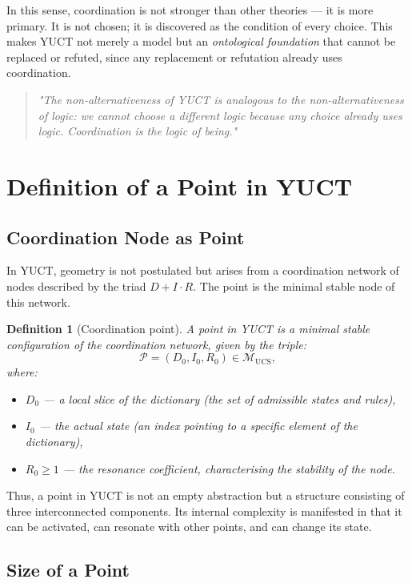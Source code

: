 \documentclass[12pt,a4paper]{article}
\newtheorem{definition}{Definition}
\newcommand{\calP}{\mathcal{P}}
\begin{document}
	In this sense, coordination is not stronger than other theories — it is more primary. It is not chosen; it is discovered as the condition of every choice. This makes YUCT not merely a model but an \emph{ontological foundation} that cannot be replaced or refuted, since any replacement or refutation already uses coordination.
	
	\begin{quote}
		\itshape
		"The non‑alternativeness of YUCT is analogous to the non‑alternativeness of logic: we cannot choose a different logic because any choice already uses logic. Coordination is the logic of being."
	\end{quote}
	
	\section{Definition of a Point in YUCT}
	
	\subsection{Coordination Node as Point}
	
	In YUCT, geometry is not postulated but arises from a coordination network of nodes described by the triad \(D+I\cdot R\). The point is the minimal stable node of this network.
	
	\begin{definition}[Coordination point]
		A point in YUCT is a minimal stable configuration of the coordination network, given by the triple:
		\[
		\calP = (D_0, I_0, R_0) \in \mathcal{M}_{\mathrm{UCS}},
		\]
		where:
		\begin{itemize}
			\item \(D_0\) — a local slice of the dictionary (the set of admissible states and rules),
			\item \(I_0\) — the actual state (an index pointing to a specific element of the dictionary),
			\item \(R_0 \ge 1\) — the resonance coefficient, characterising the stability of the node.
		\end{itemize}
	\end{definition}
	
	Thus, a point in YUCT is not an empty abstraction but a structure consisting of three interconnected components. Its internal complexity is manifested in that it can be activated, can resonate with other points, and can change its state.
	
	\subsection{Size of a Point}
	
\end{document}
